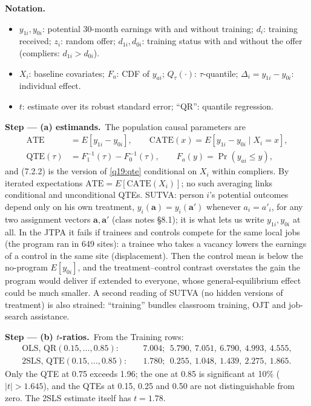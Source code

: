 \documentclass[11pt,a4paper]{article}
\newenvironment{notacao}{\par\smallskip\noindent\textbf{Notation.}\begin{itemize}[leftmargin=1.4em,topsep=1pt,itemsep=0pt]\small}{\end{itemize}}
\newcommand{\passo}[2]{\par\smallskip\noindent\textbf{Step --- #1.}~#2}
\begin{document}
\begin{sol}
\begin{notacao}
\item $y_{1i},y_{0i}$: potential 30-month earnings with and without training; $d_i$: training received;
$z_i$: random offer; $d_{1i},d_{0i}$: training status with and without the offer (compliers: $d_{1i}>d_{0i}$).
\item $X_i$: baseline covariates; $F_a$: CDF of $y_{ai}$; $Q_\tau(\cdot)$: $\tau$-quantile; $\Delta_i=y_{1i}-y_{0i}$:
individual effect.
\item $t$: estimate over its robust standard error; ``QR'': quantile regression.
\end{notacao}

\passo{(a) estimands}{The population causal parameters are
\begin{align}
\text{ATE}&=E[y_{1i}-y_{0i}],\qquad \text{CATE}(x)=E[y_{1i}-y_{0i}\mid X_i=x],\label{q19:ate}\\
\text{QTE}(\tau)&=F_1^{-1}(\tau)-F_0^{-1}(\tau),\qquad F_a(y)=\Pr(y_{ai}\leq y),\label{q19:qte}
\end{align}
and (7.2.2) is the version of \eqref{q19:qte} conditional on $X_i$ within compliers. By iterated
expectations $\text{ATE}=E[\text{CATE}(X_i)]$; no such averaging links conditional and unconditional QTEs.
SUTVA: person $i$'s potential outcomes depend only on his own treatment, $y_i(\mathbf{a})=y_i(\mathbf{a}')$
whenever $a_i=a'_i$, for any two assignment vectors $\mathbf{a},\mathbf{a}'$ (class notes \S8.1); it is what
lets us write $y_{1i},y_{0i}$ at all. In the JTPA it fails if trainees and controls compete for the same
local jobs (the program ran in 649 sites): a trainee who takes a vacancy lowers the earnings of a control
in the same site (displacement). Then the control mean is below the no-program $E[y_{0i}]$, and the
treatment--control contrast overstates the gain the program would deliver if extended to everyone, whose
general-equilibrium effect could be much smaller. A second reading of SUTVA (no hidden versions of
treatment) is also strained: ``training'' bundles classroom training, OJT and job-search assistance.}

\passo{(b) $t$-ratios}{From the Training rows:
\begin{align}
\text{OLS, QR}(0.15,\dots,0.85):&\quad 7.004;\ \ 5.790,\ 7.051,\ 6.790,\ 4.993,\ 4.555,\label{q19:tqr}\\
\text{2SLS, QTE}(0.15,\dots,0.85):&\quad 1.780;\ \ 0.255,\ 1.048,\ 1.439,\ 2.275,\ 1.865.\label{q19:tqte}
\end{align}
Only the QTE at 0.75 exceeds 1.96; the one at 0.85 is significant at 10\% ($|t|>1.645$), and the QTEs at
0.15, 0.25 and 0.50 are not distinguishable from zero. The 2SLS estimate itself has $t=1.78$.}


\end{sol}
\end{document}
